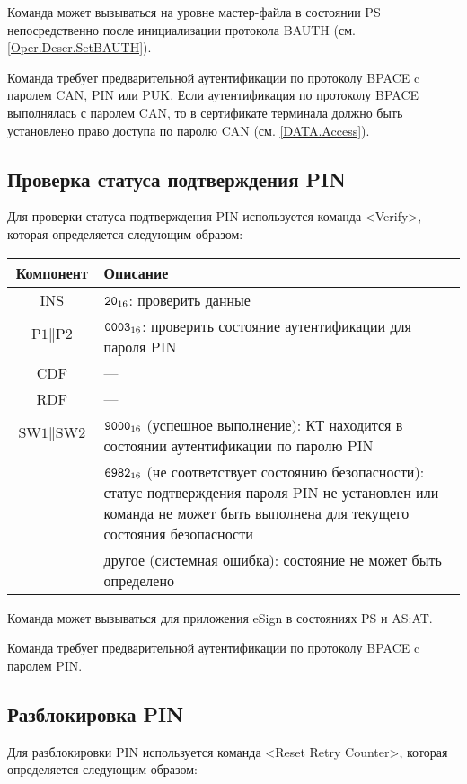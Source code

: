Команда может вызываться на уровне мастер-файла 
в состоянии PS непосредственно после 
инициализации протокола BAUTH (см. \ref{Oper.Descr.SetBAUTH}).

Команда требует предварительной аутентификации по протоколу BPACE 
c паролем CAN, PIN или PUK. Если аутентификация 
по протоколу BPACE выполнялась с паролем CAN,
то в сертификате терминала должно быть установлено 
право доступа по паролю CAN  (см. \ref{DATA.Access}).

\subsection{Проверка статуса подтверждения PIN}
\label{Oper.Descr.VerifyAuth}

Для проверки статуса подтверждения PIN
используется команда <Verify>, 
которая определяется следующим образом:

\noindent
\begin{tabular}{|c|p{14cm}|}
\hline
Компонент & Описание \\
\hline
\hline
INS & $\texttt{20}_{16}$: проверить данные\\
\hline
$\text{P1} \parallel \text{P2}$ & $\texttt{0003}_{16}$: проверить состояние аутентификации
для пароля PIN \\
\hline
CDF & --- \\
\hline \hline
RDF &  --- \\
\hline
$\text{SW1} \parallel \text{SW2}$ & $\texttt{9000}_{16}$ 
(успешное выполнение): КТ находится в состоянии аутентификации по паролю PIN\\
 & $\texttt{6982}_{16}$ (не соответствует состоянию безопасности): 
статус подтверждения пароля PIN не установлен
или команда не может быть выполнена для текущего состояния безопасности\\
 & другое (системная ошибка): состояние не может быть определено \\
\hline
\end{tabular}

Команда может вызываться для приложения eSign в состояниях PS и AS:AT.

Команда требует предварительной аутентификации по протоколу BPACE
c паролем PIN.

\subsection{Разблокировка PIN}
\label{Oper.Descr.UnblockPIN}

Для разблокировки PIN используется команда
<Reset Retry Counter>,
которая определяется следующим образом:
 
